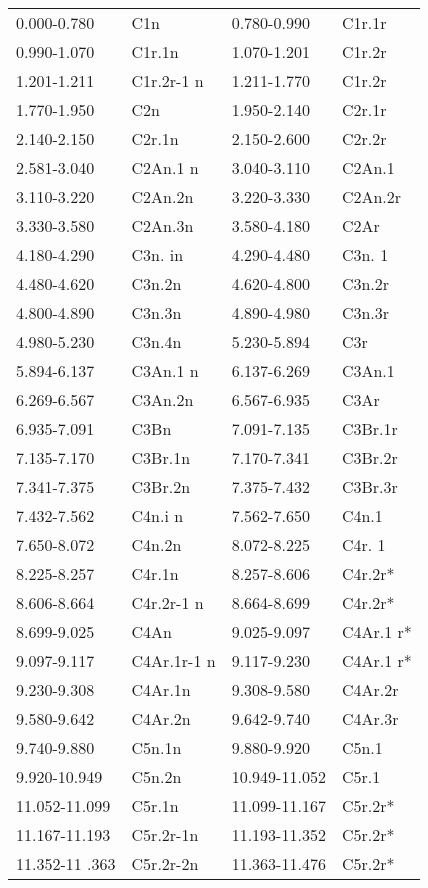 \begin{center}
\begin{longtable}{ll|ll}
0.000-0.780 &  C1n & 0.780-0.990 &  C1r.1r\\
0.990-1.070 & C1r.1n & 1.070-1.201 & C1r.2r\\
1.201-1.211 & C1r.2r-1 n & 1.211-1.770 & C1r.2r\\
1.770-1.950 & C2n & 1.950-2.140 & C2r.1r\\
2.140-2.150 & C2r.1n & 2.150-2.600 & C2r.2r\\
2.581-3.040 & C2An.1 n & 3.040-3.110 & C2An.1 \\
3.110-3.220 & C2An.2n & 3.220-3.330 & C2An.2r\\
3.330-3.580 & C2An.3n & 3.580-4.180 & C2Ar\\
4.180-4.290 & C3n. in & 4.290-4.480 & C3n. 1\\
4.480-4.620 & C3n.2n & 4.620-4.800 & C3n.2r\\
4.800-4.890 & C3n.3n & 4.890-4.980 & C3n.3r\\
4.980-5.230 & C3n.4n & 5.230-5.894 & C3r\\
5.894-6.137 & C3An.1 n & 6.137-6.269 & C3An.1 \\
6.269-6.567 & C3An.2n & 6.567-6.935 & C3Ar\\
6.935-7.091 & C3Bn & 7.091-7.135 & C3Br.1r\\
7.135-7.170 & C3Br.1n & 7.170-7.341 & C3Br.2r\\
7.341-7.375 & C3Br.2n & 7.375-7.432 & C3Br.3r\\
7.432-7.562 & C4n.i n & 7.562-7.650 & C4n.1\\
7.650-8.072 & C4n.2n & 8.072-8.225 & C4r. 1\\
8.225-8.257 & C4r.1n & 8.257-8.606 & C4r.2r*\\
8.606-8.664 & C4r.2r-1 n & 8.664-8.699 & C4r.2r*\\
8.699-9.025 & C4An & 9.025-9.097 & C4Ar.1 r*\\
9.097-9.117 & C4Ar.1r-1 n & 9.117-9.230 & C4Ar.1 r*\\
9.230-9.308 & C4Ar.1n & 9.308-9.580 & C4Ar.2r\\
9.580-9.642 & C4Ar.2n & 9.642-9.740 & C4Ar.3r\\
9.740-9.880 & C5n.1n & 9.880-9.920 & C5n.1\\
9.920-10.949 & C5n.2n & 10.949-11.052 & C5r.1\\
11.052-11.099 & C5r.1n &  11.099-11.167 & C5r.2r*\\
11.167-11.193 & C5r.2r-1n & 11.193-11.352 & C5r.2r*\\
11.352-11 .363 & C5r.2r-2n & 11.363-11.476 & C5r.2r*\\

\end{longtable}
\end{center}
